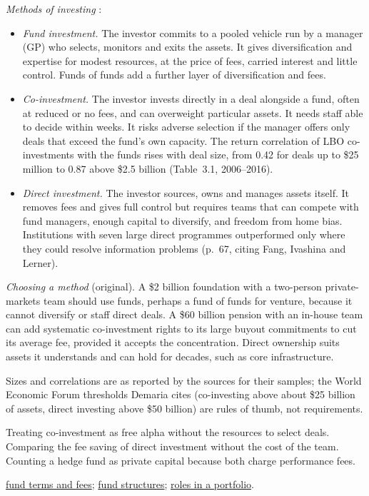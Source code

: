 \begin{qfdefinition}
\emph{Methods of investing} \citep[pp.~60--66, 95--98]{demaria-private-markets-2021}:
\begin{itemize}
\item \emph{Fund investment.} The investor commits to a pooled vehicle run by a manager (GP) who selects, monitors and exits the assets. It gives diversification and expertise for modest resources, at the price of fees, carried interest and little control. Funds of funds add a further layer of diversification and fees.
\item \emph{Co-investment.} The investor invests directly in a deal alongside a fund, often at reduced or no fees, and can overweight particular assets. It needs staff able to decide within weeks. It risks adverse selection if the manager offers only deals that exceed the fund's own capacity. The return correlation of LBO co-investments with the funds rises with deal size, from 0.42 for deals up to \$25 million to 0.87 above \$2.5 billion (Table~3.1, 2006--2016).
\item \emph{Direct investment.} The investor sources, owns and manages assets itself. It removes fees and gives full control but requires teams that can compete with fund managers, enough capital to diversify, and freedom from home bias. Institutions with seven large direct programmes outperformed only where they could resolve information problems (p.~67, citing Fang, Ivashina and Lerner).
\end{itemize}

 \emph{Choosing a method} (original). A \$2 billion foundation with a two-person private-markets team should use funds, perhaps a fund of funds for venture, because it cannot diversify or staff direct deals. A \$60 billion pension with an in-house team can add systematic co-investment rights to its large buyout commitments to cut its average fee, provided it accepts the concentration. Direct ownership suits assets it understands and can hold for decades, such as core infrastructure.

 Sizes and correlations are as reported by the sources for their samples; the World Economic Forum thresholds Demaria cites (co-investing above about \$25 billion of assets, direct investing above \$50 billion) are rules of thumb, not requirements.

 Treating co-investment as free alpha without the resources to select deals. Comparing the fee saving of direct investment without the cost of the team. Counting a hedge fund as private capital because both charge performance fees.

 \hyperref[def:alternative-fund-terms]{fund terms and fees}; \hyperref[meth:private-fund-structures]{fund structures}; \hyperref[def:alternatives-roles-opportunity-set]{roles in a portfolio}.

\end{qfdefinition}

